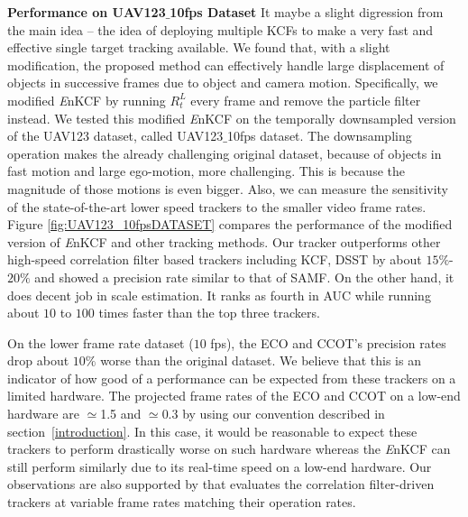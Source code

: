 \documentclass[10pt,twocolumn,letterpaper]{article}
\begin{document}
\textbf{Performance on UAV123$\_$10fps Dataset} It maybe a slight
digression from the main idea -- the idea of deploying multiple KCFs
to make a very fast and effective single target tracking available. We
found that, with a slight modification, the proposed method can
effectively handle large displacement of objects in successive frames
due to object and camera motion. Specifically, we modified {\it E}nKCF
by running $R_{t}^{L}$ every frame and remove the particle filter
instead. We tested this modified {\it E}nKCF on the temporally
downsampled version of the UAV123 dataset, called UAV123$\_$10fps
dataset. The downsampling operation makes the already challenging
original dataset, because of objects in fast motion and large
ego-motion, more challenging. This is because the magnitude of those
motions is even bigger. Also, we can measure the sensitivity of the
state-of-the-art lower speed trackers to the smaller video frame
rates.  Figure \ref{fig:UAV123_10fpsDATASET} compares the performance
of the modified version of {\it E}nKCF and other tracking methods. Our
tracker outperforms other high-speed correlation filter based trackers
including KCF, DSST by about $15\%$-$20\%$ and showed a precision rate
similar to that of SAMF. On the other hand, it does decent job in
scale estimation. It ranks as fourth in AUC while running about $10$
to $100$ times faster than the top three trackers.

On the lower frame rate dataset ($10$ fps), the ECO and CCOT's
precision rates drop about $10\%$ worse than the original dataset. We
believe that this is an indicator of how good of a performance can be
expected from these trackers on a limited hardware. The projected
frame rates of the ECO and CCOT on a low-end hardware are $\simeq$1.5
and $\simeq$0.3 by using our convention described in
section~\ref{introduction}. In this case, it would be reasonable to
expect these trackers to perform drastically worse on such hardware
whereas the {\it E}nKCF can still perform similarly due to its
real-time speed on a low-end hardware. Our observations are also
supported by \cite{mueller2017context} that evaluates the correlation
filter-driven trackers at variable frame rates matching their
operation rates.
\end{document}
